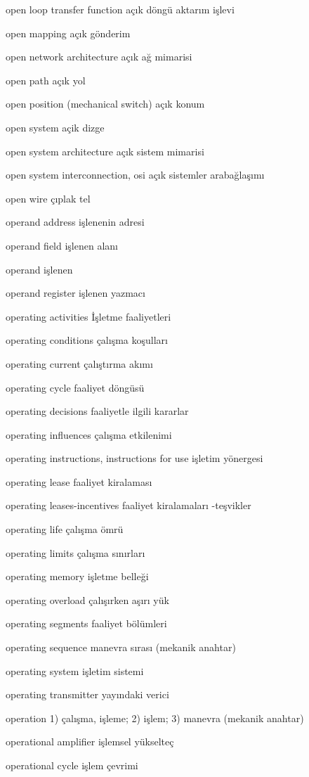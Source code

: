 \documentclass[12pt,fleqn]{article}\usepackage{../../common}
\begin{document}
open loop transfer function açık döngü aktarım işlevi

open mapping açık gönderim

open network architecture açık ağ mimarisi

open path açık yol

open position (mechanical switch) açık konum

open system açik dizge

open system architecture açık sistem mimarisi

open system interconnection, osi açık sistemler arabağlaşımı

open wire çıplak tel

operand address işlenenin adresi

operand field işlenen alanı

operand işlenen

operand register işlenen yazmacı

operating activities İşletme faaliyetleri

operating conditions çalışma koşulları

operating current çalıştırma akımı

operating cycle faaliyet döngüsü

operating decisions faaliyetle ilgili kararlar

operating influences çalışma etkilenimi

operating instructions, instructions for use işletim yönergesi

operating lease faaliyet kiralaması

operating leases-incentives faaliyet kiralamaları -teşvikler

operating life çalışma ömrü

operating limits çalışma sınırları

operating memory işletme belleği

operating overload çalışırken aşırı yük

operating segments faaliyet bölümleri

operating sequence manevra sırası (mekanik anahtar)

operating system işletim sistemi

operating transmitter yayındaki verici

operation 1) çalışma, işleme; 2) işlem; 3) manevra (mekanik anahtar)

operational amplifier işlemsel yükselteç

operational cycle işlem çevrimi
\end{document}
